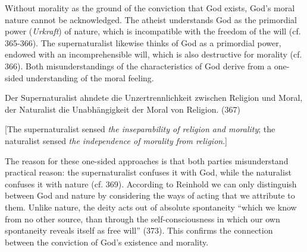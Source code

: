  Without morality as the ground of the conviction that God exists, God's moral nature cannot be acknowledged. The atheist understands God as the primordial power (\textit{Urkraft}) of nature, which is incompatible with the freedom of the will (cf. 365{-}366). The supernaturalist likewise thinks of God as a primordial power, endowed with an incomprehensible will, which is also destructive for morality (cf. 366). Both misunderstandings of the characteristics of God derive from a one{-}sided understanding of the moral feeling.

Der Supernaturalist ahndete die Unzertrennlichkeit zwischen Religion und Moral, der Naturalist die Unabh\"{a}ngigkeit der Moral von Religion. (367)

[The supernaturalist sensed \textit{the inseparability of religion and morality}; the naturalist sensed \textit{the independence of morality from religion}.] 

The reason for these one{-}sided approaches is that both parties misunderstand practical reason: the supernaturalist confuses it with God, while the naturalist confuses it with nature (cf. 369). According to Reinhold we can only distinguish between God and nature by considering the ways of acting that we attribute to them. Unlike nature, the deity acts out of absolute spontaneity ``which we know from no other source, than through the self{-}consciousness in which our own spontaneity reveals itself as free will'' (373). This confirms the connection between the conviction of God's existence and morality. 

